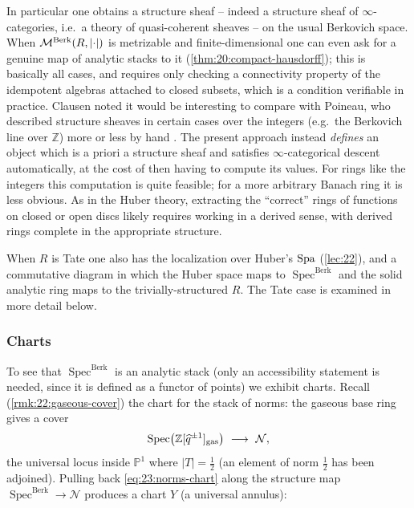 \begin{remark}
\label{rmk:23:structure-sheaf}
In particular one obtains a structure sheaf -- indeed a structure sheaf of
$\infty$-categories, i.e.\ a theory of quasi-coherent sheaves -- on the usual
Berkovich space. When $\mathcal{M}^{\mathrm{Berk}}(R,\lvert\cdot\rvert)$ is metrizable and
finite-dimensional one can even ask for a genuine map of analytic stacks to it
(\cref{thm:20:compact-hausdorff}); this is basically all cases, and requires
only checking a connectivity property of the idempotent algebras attached to
closed subsets, which is a condition verifiable in practice. Clausen noted it
would be interesting to compare with Poineau, who described structure sheaves
in certain cases over the integers (e.g.\ the Berkovich line over $\mathbb Z$)
more or less by hand \cite{poineau2008ladroiteberkovichsur,poineau2012espacesberkovichsurz}.
The present approach instead \emph{defines} an object which is a priori a
structure sheaf and satisfies $\infty$-categorical descent automatically, at the
cost of then having to compute its values. For rings like the integers this
computation is quite feasible; for a more arbitrary Banach ring it is less
obvious. As in the Huber theory, extracting the ``correct'' rings of functions
on closed or open discs likely requires working in a derived sense, with derived
rings complete in the appropriate structure.
\end{remark}

\begin{remark}
\label{rmk:23:spa-comparison}
When $R$ is Tate one also has the localization over Huber's $\operatorname{Spa}$
(\cref{lec:22}), and a commutative diagram in which the Huber space maps to
$\operatorname{Spec}^{\mathrm{Berk}}$ and the solid analytic ring maps to the
trivially-structured $R$. The Tate case is examined in more detail below.
\end{remark}

\subsubsection*{Charts}

To see that $\operatorname{Spec}^{\mathrm{Berk}}$ is an analytic stack (only an
accessibility statement is needed, since it is defined as a functor of points)
we exhibit charts. Recall (\cref{rmk:22:gaseous-cover}) the chart for the stack
of norms: the gaseous base ring gives a cover
\begin{equation}
\label{eq:23:norms-chart}
\operatorname{Spec}\bigl(\mathbb Z[\widehat q^{\pm1}]_{\mathrm{gas}}\bigr)
\ \longrightarrow\ \mathcal N ,
\end{equation}
the universal locus inside $\mathbb P^1$ where $\lvert T\rvert=\tfrac12$
(an element of norm $\tfrac12$ has been adjoined). Pulling back
\eqref{eq:23:norms-chart} along the structure map
$\operatorname{Spec}^{\mathrm{Berk}}\to\mathcal N$ produces a chart
$Y$ (a universal annulus):

